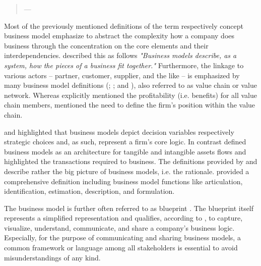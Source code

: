 \begin{quotation}\vspace*{-5pt}{\slshape 
A business model describes the rationale of how an organization creates, delivers and captures value.}
\vspace*{-7pt}
\begin{flushright}
	--- \citealp[p. 14]{Osterwalder2010}
\end{flushright}
\end{quotation}

Most of the previously mentioned definitions of the term respectively concept business model emphasize to abstract the complexity how a company does business through the concentration on the core elements and their interdependencies. \citet[p. 91]{Magretta2002} described this as follows \textit{"Business models describe, as a system, how the pieces of a business fit together."} Furthermore, the linkage to various actors -- partner, customer, supplier, and the like -- is emphasized by many business model definitions (\citealp[p. 2]{Timmers1998}; \citealp[pp. 533-534]{Chesbrough2002}; and \citealp[p. 202]{Shafer2005}), also referred to as value chain or value network. Whereas \citet[p. 2]{Timmers1998} explicitly mentioned the profitability (i.e. benefits) for all value chain members, \citet[pp. 533-534]{Chesbrough2002} mentioned the need to define the firm's position within the value chain.

\citet[p. 727]{Morris2005} and \citet[p. 202]{Shafer2005} highlighted that business models depict decision variables respectively strategic choices and, as such, represent a firm's core logic. In contrast \citet[p. 2]{Timmers1998} defined business models as an architecture for tangible and intangible assets flows and \citet[p. 511]{Amit2001} highlighted the transactions required to business. The definitions provided by \citet[p. 52]{Johnson2008} and \citet[p. 14]{Osterwalder2010} describe rather the big picture of business models, i.e. the rationale. \citet[p. 533-534]{Chesbrough2002} provided a comprehensive definition including business model functions like articulation, identification, estimation, description, and formulation.

The business model is further often referred to as blueprint . The blueprint itself represents a simplified representation and qualifies, according to \citet[pp. 11-14]{Osterwalder2005}, to capture, visualize, understand, communicate, and share a company's business logic. Especially, for the purpose of communicating and sharing business models, a common framework or language among all stakeholders is essential to avoid misunderstandings of any kind.

